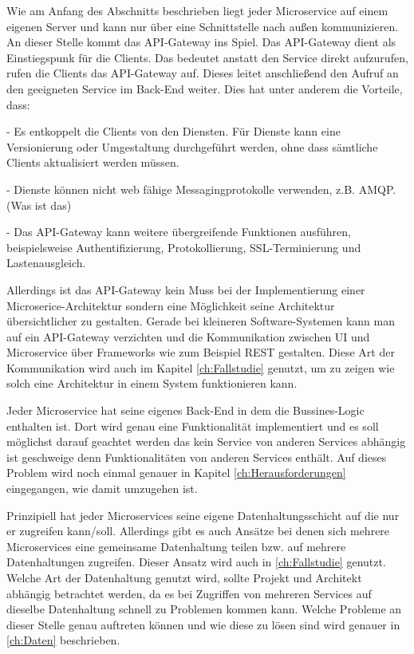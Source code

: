 Wie am Anfang des Abschnitts beschrieben liegt jeder Microservice auf einem eigenen Server und kann nur über eine Schnittstelle nach außen kommunizieren. An dieser Stelle kommt das API-Gateway ins Spiel.
Das API-Gateway dient als Einstiegspunk für die Clients. Das bedeutet anstatt den Service direkt aufzurufen, rufen die Clients das API-Gateway auf. Dieses leitet anschließend den Aufruf an den geeigneten Service im Back-End weiter.  Dies hat unter anderem die Vorteile, dass\cite{microsoft}:
\begin{description}
	\item - Es entkoppelt die Clients von den Diensten. Für Dienste kann eine Versionierung oder Umgestaltung durchgeführt werden, ohne dass sämtliche Clients aktualisiert werden müssen. 
	\item - Dienste können nicht web fähige Messagingprotokolle verwenden, z.B. AMQP. (Was ist das)
	\item - Das API-Gateway kann weitere übergreifende Funktionen ausführen, beispielsweise Authentifizierung, Protokollierung, SSL-Terminierung und Lastenausgleich.
\end{description}

Allerdings ist das API-Gateway kein Muss bei der Implementierung einer Microserice-Architektur sondern eine Möglichkeit seine Architektur übersichtlicher zu gestalten. Gerade bei kleineren Software-Systemen kann man auf ein API-Gateway verzichten und die Kommunikation zwischen UI und Microservice über Frameworks wie zum Beispiel REST gestalten. Diese Art der Kommunikation wird auch im Kapitel \ref{ch:Fallstudie} genutzt, um zu zeigen wie solch eine Architektur in einem System funktionieren kann.\newpage


Jeder Microservice hat seine eigenes Back-End in dem die Bussines-Logic enthalten ist. Dort wird genau eine Funktionalität implementiert und es soll möglichst darauf geachtet werden das kein Service von anderen Services abhängig ist geschweige denn Funktionalitäten von anderen Services enthält. Auf dieses Problem wird noch einmal genauer in Kapitel \ref{ch:Herausforderungen} eingegangen, wie damit umzugehen ist.\newline\newline

Prinzipiell hat jeder Microservices seine eigene Datenhaltungsschicht auf die nur er zugreifen kann/soll. Allerdings gibt es auch Ansätze bei denen sich mehrere Microservices eine gemeinsame Datenhaltung teilen bzw. auf mehrere Datenhaltungen zugreifen. Dieser Ansatz wird auch in \ref{ch:Fallstudie} genutzt. 
Welche Art der Datenhaltung genutzt wird, sollte Projekt und Architekt abhängig betrachtet werden, da es bei Zugriffen von mehreren Services auf dieselbe Datenhaltung schnell zu Problemen kommen kann. Welche Probleme an dieser Stelle genau auftreten können und wie diese zu lösen sind wird genauer in \ref{ch:Daten} beschrieben.

